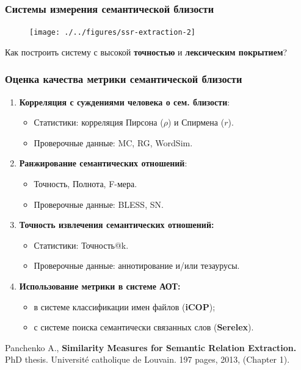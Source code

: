 \documentclass{beamer}
\begin{document}
\begin{frame}
\frametitle{Системы измерения семантической близости}
\begin{figure}
\centering
\texttt{[image: ./../figures/ssr-extraction-2]}
\end{figure}
Как построить систему с высокой \textbf{точностью} и \textbf{лексическим покрытием}? 
\end{frame}





\begin{frame}
\frametitle{Оценка качества метрики семантической близости}

\begin{enumerate}
\item \textbf{Корреляция с суждениями человека о сем. близости}:
\begin{itemize}
  \item Статистики: корреляция Пирсона ($\rho$) и Спирмена ($r$).
  \item Проверочные данные: MC, RG, WordSim.
\end{itemize}

\item \textbf{Ранжирование семантических отношений}:
\begin{itemize}
  \item Точность, Полнота, F-мера.
  \item Проверочные данные: BLESS, SN.
\end{itemize}


\item \textbf{Точность извлечения семантических отношений:}
\begin{itemize}
  \item Статистики: Точность@k.
  \item Проверочные данные: аннотирование и/или тезаурусы.
\end{itemize}

\item \textbf{Использование метрики в системе АОТ:}
\begin{itemize}
\item в системе классификации имен файлов (\textbf{iCOP});
\item с системе поиска семантически связанных слов (\textbf{Serelex}).
\end{itemize}
\end{enumerate}


Panchenko A., \textbf{Similarity Measures for Semantic Relation Extraction.} PhD thesis. Universit\'{e} catholique de Louvain. 197 pages, 2013, (Chapter 1). 

\end{frame}
\end{document}
